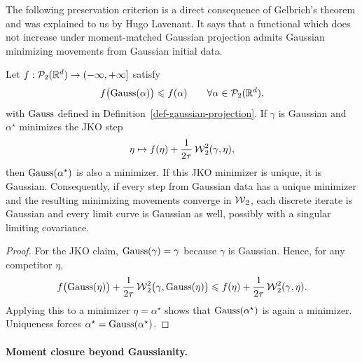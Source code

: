 The following preservation criterion is a direct consequence of Gelbrich's theorem and was explained to us by Hugo Lavenant. It says that a functional which does not increase under moment-matched Gaussian projection admits Gaussian minimizing movements from Gaussian initial data.

\begin{thm}\label{thm-lavenant-gaussian-preserving-jko}
	Let $f:\mathcal{P}_2(\mathbb{R}^d)\to(-\infty,+\infty]$ satisfy
	\[
		f\bigl(\operatorname{Gauss}(\alpha)\bigr)\leqslant f(\alpha)
		\qquad\forall\alpha\in\mathcal{P}_2(\mathbb{R}^d),
	\]
	with $\operatorname{Gauss}$ defined in Definition~\ref{def-gaussian-projection}. If $\gamma$ is Gaussian and $\alpha^\star$ minimizes the JKO step
	\[
		\eta\mapsto f(\eta)+\frac1{2\tau}\operatorname{\mathcal{W}}_2^2(\gamma,\eta),
	\]
	then $\operatorname{Gauss}(\alpha^\star)$ is also a minimizer. If this JKO minimizer is unique, it is Gaussian. Consequently, if every step from Gaussian data has a unique minimizer and the resulting minimizing movements converge in $\operatorname{\mathcal{W}}_2$, each discrete iterate is Gaussian and every limit curve is Gaussian as well, possibly with a singular limiting covariance.
\end{thm}

\begin{proof}
	For the JKO claim, $\operatorname{Gauss}(\gamma)=\gamma$ because $\gamma$ is Gaussian. Hence, for any competitor $\eta$,
	\[
		f\bigl(\operatorname{Gauss}(\eta)\bigr)+\frac1{2\tau}\operatorname{\mathcal{W}}_2^2\bigl(\gamma,\operatorname{Gauss}(\eta)\bigr)
		\leqslant
		f(\eta)+\frac1{2\tau}\operatorname{\mathcal{W}}_2^2(\gamma,\eta).
	\]
	Applying this to a minimizer $\eta=\alpha^\star$ shows that $\operatorname{Gauss}(\alpha^\star)$ is again a minimizer. Uniqueness forces $\alpha^\star=\operatorname{Gauss}(\alpha^\star)$.
\end{proof}

\paragraph{Moment closure beyond Gaussianity.}

